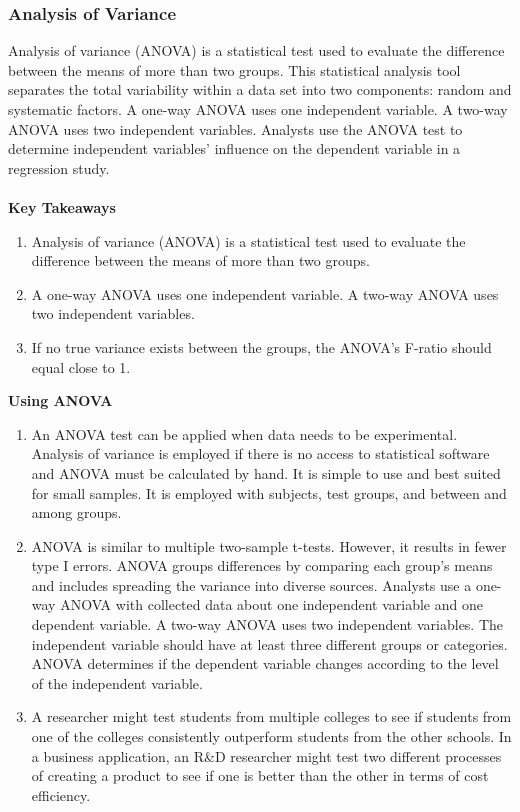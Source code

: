 \documentclass[a4paper]{article}
\theoremstyle{definition}
\begin{document}
\subsubsection{Analysis of Variance}

Analysis of variance (ANOVA) is a statistical test used to evaluate the difference between the means of more than two groups. This statistical analysis tool separates the total variability within a data set into two components: random and systematic factors.
A one-way ANOVA uses one independent variable. A two-way ANOVA uses two independent variables. Analysts use the ANOVA test to determine independent variables' influence on the dependent variable in a regression study.
\\
\\
\textbf{Key Takeaways}
\begin{enumerate}
    \item Analysis of variance (ANOVA) is a statistical test used to evaluate the difference between the means of more than two groups.
    \item A one-way ANOVA uses one independent variable. A two-way ANOVA uses two independent variables.
    \item If no true variance exists between the groups, the ANOVA's F-ratio should equal close to 1.
\end{enumerate}
\textbf{Using ANOVA}
\begin{enumerate}
    \item An ANOVA test can be applied when data needs to be experimental. Analysis of variance is employed if there is no access to statistical software and ANOVA must be calculated by hand. It is simple to use and best suited for small samples. It is employed with subjects, test groups, and between and among groups.
    \item ANOVA is similar to multiple two-sample t-tests. However, it results in fewer type I errors. ANOVA groups differences by comparing each group's means and includes spreading the variance into diverse sources. Analysts use a one-way ANOVA with collected data about one independent variable and one dependent variable. A two-way ANOVA uses two independent variables. The independent variable should have at least three different groups or categories. ANOVA determines if the dependent variable changes according to the level of the independent variable. 

    \item A researcher might test students from multiple colleges to see if students from one of the colleges consistently outperform students from the other schools. In a business application, an R\&D researcher might test two different processes of creating a product to see if one is better than the other in terms of cost efficiency.
\end{enumerate}
\end{document}
